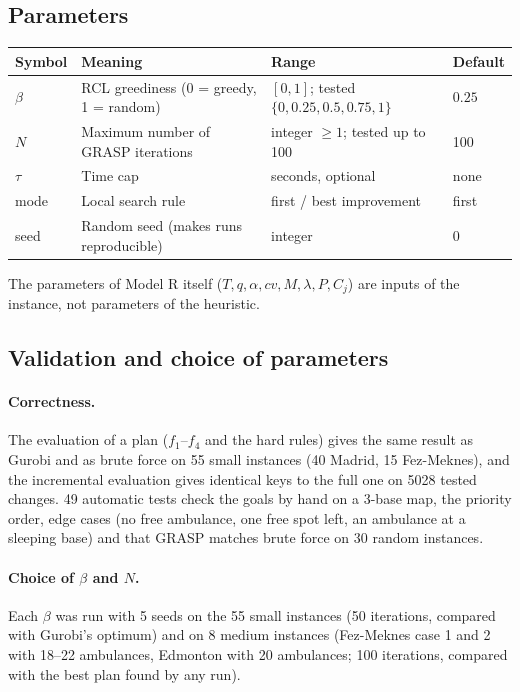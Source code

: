 \subsection{Parameters}

\begin{center}
\begin{tabular}{@{}llll@{}}
  \toprule
  Symbol & Meaning & Range & Default \\
  \midrule
  $\beta$ & RCL greediness (0 = greedy, 1 = random) & $[0, 1]$; tested $\{0, 0.25, 0.5, 0.75, 1\}$ & $0.25$ \\
  $N$ & Maximum number of GRASP iterations & integer $\ge 1$; tested up to 100 & 100 \\
  $\tau$ & Time cap & seconds, optional & none \\
  mode & Local search rule & first / best improvement & first \\
  seed & Random seed (makes runs reproducible) & integer & 0 \\
  \bottomrule
\end{tabular}
\end{center}
The parameters of Model R itself ($T, q, \alpha, cv, M, \lambda, P, C_j$) are inputs of the
instance, not parameters of the heuristic.

\subsection{Validation and choice of parameters}

\paragraph{Correctness.} The evaluation of a plan ($f_1$--$f_4$ and the hard rules) gives the same
result as Gurobi and as brute force on 55 small instances (40 Madrid, 15 Fez-Meknes), and the
incremental evaluation gives identical keys to the full one on 5028 tested changes. 49 automatic
tests check the goals by hand on a 3-base map, the priority order, edge cases (no free ambulance,
one free spot left, an ambulance at a sleeping base) and that GRASP matches brute force on
30 random instances.

\paragraph{Choice of $\beta$ and $N$.} Each $\beta$ was run with 5 seeds on the 55 small
instances (50 iterations, compared with Gurobi's optimum) and on 8 medium instances (Fez-Meknes
case 1 and 2 with 18--22 ambulances, Edmonton with 20 ambulances; 100 iterations, compared with
the best plan found by any run).

